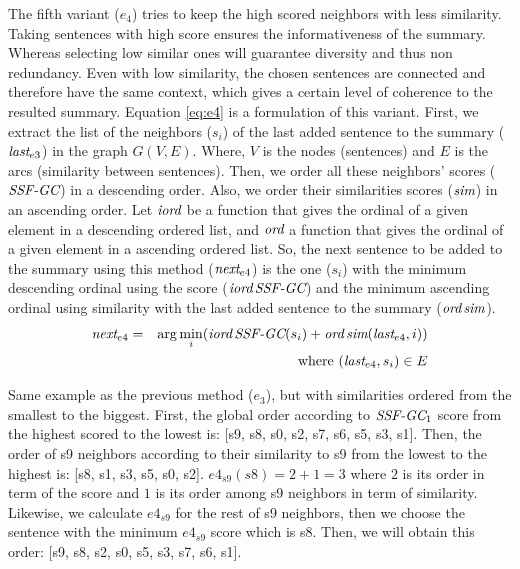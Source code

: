 The fifth variant ($ e_4 $) tries to keep the high scored neighbors with less similarity. 
Taking sentences with high score ensures the informativeness of the summary. 
Whereas selecting low similar ones will guarantee diversity and thus non redundancy. 
Even with low similarity, the chosen sentences are connected and therefore have the same context, which gives a certain level of coherence to the resulted summary.
Equation \ref{eq:e4} is a formulation of this variant.
First, we extract the list of the neighbors ($s_i$) of the last added sentence to the summary ($\operatorname{\textit{last}}_{e3}$) in the graph $ G(V, E) $.
Where, $ V $ is the nodes (sentences) and $ E $ is the arcs (similarity between sentences). 
Then, we order all these neighbors' scores ($\operatorname{\textit{SSF-GC}}$) in a descending order. 
Also, we order their similarities scores ($\operatorname{\textit{sim}}$) in an ascending order. 
Let $ \operatorname{\textit{iord}} $ be a function that gives the ordinal of a given element in a descending ordered list, and $ \operatorname{\textit{ord}} $ a function that gives the ordinal of a given element in a ascending ordered list.
So, the next sentence to be added to the summary using this method ($\operatorname{\textit{next}}_{e4}$) is the one ($s_i$) with the minimum descending ordinal using the score ($\operatorname{\textit{iord}}\operatorname{\textit{SSF-GC}}$) and the minimum ascending ordinal using similarity with the last added sentence to the summary ($\operatorname{\textit{ord}}\operatorname{\textit{sim}}$).
\begin{equation}
	\begin{aligned}
		\operatorname{\textit{next}}_{e4} & = & \arg\min\limits_i (\operatorname{\textit{iord}}\operatorname{\textit{SSF-GC}}(s_i) + \operatorname{\textit{ord}}\operatorname{\textit{sim}}(\operatorname{\textit{last}}_{e4}, i)) \\
		&& \text{ where } (\operatorname{\textit{last}}_{e4}, s_i) \in E \\
	\end{aligned}
	\label{eq:e4}
\end{equation}

Same example as the previous method ($ e_3 $), but with similarities ordered from the smallest to the biggest.
First, the global order according to $ \operatorname{\textit{SSF-GC}}_1 $ score from the highest scored to the lowest is: [s9, s8, s0, s2, s7, s6, s5, s3, s1].
Then, the order of s9 neighbors according to their similarity to s9 from the lowest to the highest is: [s8, s1, s3, s5, s0, s2].
$ e4_{s9}(s8) = 2 + 1 = 3 $ where $ 2 $ is its order in term of the score and $ 1 $ is its order among s9 neighbors in term of similarity. 
Likewise, we calculate $ e4_{s9} $ for the rest of s9 neighbors, then we choose the sentence with the minimum $ e4_{s9} $ score which is s8. 
Then, we will obtain this order: [s9, s8, s2, s0, s5, s3, s7, s6, s1].

